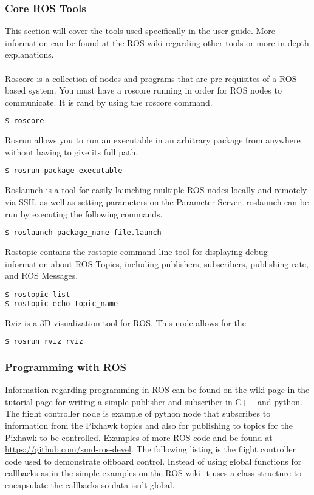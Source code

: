 \subsubsection{Core ROS Tools}
This section will cover the tools used specifically in the user guide. More information can be found at the ROS wiki regarding other tools or more in depth explanations.\\
\\
Roscore is a collection of nodes and programs that are pre-requisites of a ROS-based system. You must have a roscore running in order for ROS nodes to communicate. It is rand by using the roscore command.
\begin{lstlisting}[language=bash]
$ roscore
\end{lstlisting}
Rosrun allows you to run an executable in an arbitrary package from anywhere without having to give its full path.
\begin{lstlisting}[language=bash]
$ rosrun package executable
\end{lstlisting}
Roslaunch is a tool for easily launching multiple ROS nodes locally and remotely via SSH, as well as setting parameters on the Parameter Server. roslaunch can be run by executing the following commands.
\begin{lstlisting}[language=bash]
$ roslaunch package_name file.launch
\end{lstlisting}
Rostopic contains the rostopic command-line tool for displaying debug information about ROS Topics, including publishers, subscribers, publishing rate, and ROS Messages.
\begin{lstlisting}[language=bash]
$ rostopic list
$ rostopic echo topic_name
\end{lstlisting}
Rviz is a 3D visualization tool for ROS. This node allows for the 
\begin{lstlisting}[language=bash]
$ rosrun rviz rviz
\end{lstlisting}
\subsubsection{Programming with ROS}
Information regarding programming in ROS can be found on the wiki page in the tutorial page for writing a simple publisher and subscriber in C++ and python. The flight controller node is example of python node that subscribes to information from the Pixhawk topics and also for publishing to topics for the Pixhawk to be controlled. Examples of more ROS code and be found at \url{https://github.com/smd-ros-devel}. The following listing is the flight controller code used to demonstrate offboard control. Instead of using global functions for callbacks as in the simple examples on the ROS wiki it uses a class structure to encapsulate the callbacks so data isn't global.

